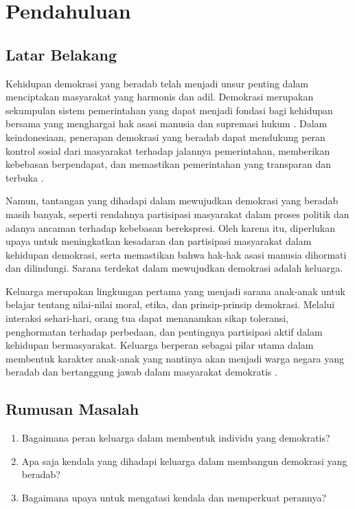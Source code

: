 \section{Pendahuluan}


\subsection{Latar Belakang}

Kehidupan demokrasi yang beradab telah menjadi unsur penting dalam menciptakan masyarakat yang harmonis dan adil. Demokrasi merupakan sekumpulan sistem pemerintahan yang dapat menjadi fondasi bagi kehidupan bersama yang menghargai hak asasi manusia dan supremasi hukum \cite{smkGitaKirtti2019}. Dalam keindonesiaan, penerapan demokrasi yang beradab dapat mendukung peran kontrol sosial dari masyarakat terhadap jalannya pemerintahan, memberikan kebebasan berpendapat, dan memastikan pemerintahan yang transparan dan terbuka \cite{putri2020}.

Namun, tantangan yang dihadapi dalam mewujudkan demokrasi yang beradab masih banyak, seperti rendahnya partisipasi masyarakat dalam proses politik dan adanya ancaman terhadap kebebasan berekspresi. Oleh karena itu, diperlukan upaya untuk meningkatkan kesadaran dan partisipasi masyarakat dalam kehidupan demokrasi, serta memastikan bahwa hak-hak asasi manusia dihormati dan dilindungi. Sarana terdekat dalam mewujudkan demokrasi adalah keluarga.

Keluarga merupakan lingkungan pertama yang menjadi sarana anak-anak untuk belajar tentang nilai-nilai moral, etika, dan prinsip-prinsip demokrasi. Melalui interaksi sehari-hari, orang tua dapat menanamkan sikap toleransi, penghormatan terhadap perbedaan, dan pentingnya partisipasi aktif dalam kehidupan bermasyarakat. Keluarga berperan sebagai pilar utama dalam membentuk karakter anak-anak yang nantinya akan menjadi warga negara yang beradab dan bertanggung jawab dalam masyarakat demokratis \cite{suryawan2018}.

\subsection{Rumusan Masalah}

\begin{enumerate}
    \item Bagaimana peran keluarga dalam membentuk individu yang demokratis?
    \item Apa saja kendala yang dihadapi keluarga dalam membangun demokrasi yang beradab?
    \item Bagaimana upaya untuk mengatasi kendala dan memperkuat perannya?
\end{enumerate}

